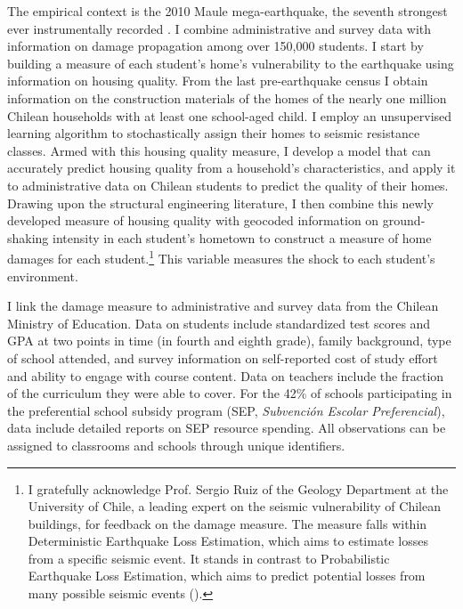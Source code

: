 The empirical context is the 2010 Maule mega-earthquake, the seventh strongest ever instrumentally recorded \citep{USGSCatalog2025}. I combine administrative and survey data with information on damage propagation among over 150,000 students. I start by building a measure of each student's home's vulnerability to the earthquake using information on housing quality. From the last pre-earthquake census I obtain information on the construction materials of the homes of the nearly one million Chilean households with at least one school-aged child. I employ an unsupervised learning algorithm to stochastically assign their homes to seismic resistance classes. Armed with this housing quality measure, I develop a model that can accurately predict housing quality from a household's characteristics, and apply it to administrative data on Chilean students to predict the quality of their homes. Drawing upon the structural engineering literature, I then combine this newly developed measure of housing quality with geocoded information on ground-shaking intensity in each student's hometown to construct a measure of home damages for each student.\footnote{I gratefully acknowledge Prof. Sergio Ruiz of the Geology Department at the University of Chile, a leading expert on the seismic vulnerability of Chilean buildings, for feedback on the damage measure. The measure falls within Deterministic Earthquake Loss Estimation, which aims to estimate losses from a specific seismic event. It stands in contrast to Probabilistic Earthquake Loss Estimation, which aims to predict potential losses from many possible seismic events (\cite{McGuire2004Seismic}).} This variable measures the shock to each student's environment.\par



I link the damage measure to administrative and survey data from the Chilean Ministry of Education. Data on students include standardized test scores and GPA at two points in time (in fourth and eighth grade), family background, type of school attended, and survey information on self-reported cost of study effort and ability to engage with course content. Data on teachers include the fraction of the curriculum they were able to cover. For the 42\% of schools participating in the preferential school subsidy program (SEP, {\itshape Subvenci\'{o}n Escolar Preferencial}), data include detailed reports on SEP resource spending.  All observations can be assigned to classrooms and schools through unique identifiers.\par  


